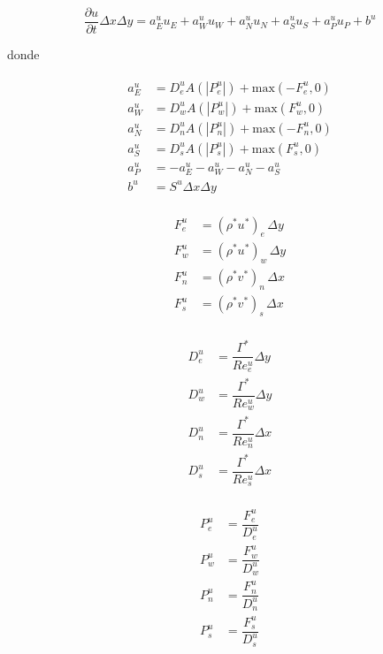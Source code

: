 \begin{equation}
\dfrac{\partial u}{\partial t} \Delta x \Delta y = a_E^u u_E + a_W^u u_W + a_N^u u_N + a_S^u u_S + a_P^u u_P + b^u
\end{equation} 

donde 

\begin{align}
\begin{split}
a_E^u &= D_e^u A(|P_e^u|) + \mbox{max}(-F_e^u,0) \\
a_W^u &= D_w^u A(|P_w^u|) + \mbox{max}(F_w^u,0) \\
a_N^u &= D_n^u A(|P_n^u|) + \mbox{max}(-F_n^u,0) \\
a_S^u &= D_s^u A(|P_s^u|) + \mbox{max}(F_s^u,0) \\
a_P^u &= -a_E^u -a_W^u -a_N^u -a_S^u \\
b^u &= S^u \Delta x \Delta y
\end{split}
\end{align}

\begin{align}
\begin{split}
F_e^u &= (\rho^* u^*)_e \, \Delta y \\
F_w^u &= (\rho^* u^*)_w \, \Delta y \\
F_n^u &= (\rho^* v^*)_n \, \Delta x \\
F_s^u &= (\rho^* v^*)_s \, \Delta x
\end{split}
\end{align}

\begin{align}
\begin{split}
D_e^u &= \dfrac{\Gamma^*}{Re_e^u} \Delta y \\
D_w^u &= \dfrac{\Gamma^*}{Re_w^u} \Delta y \\
D_n^u &= \dfrac{\Gamma^*}{Re_n^u} \Delta x \\
D_s^u &= \dfrac{\Gamma^*}{Re_s^u} \Delta x
\end{split}
\end{align}

\begin{align}
\begin{split}
P_e^u &= \dfrac{F_e^u}{D_e^u} \\
P_w^u &= \dfrac{F_w^u}{D_w^u} \\
P_n^u &= \dfrac{F_n^u}{D_n^u} \\
P_s^u &= \dfrac{F_s^u}{D_s^u}
\end{split}
\end{align}

